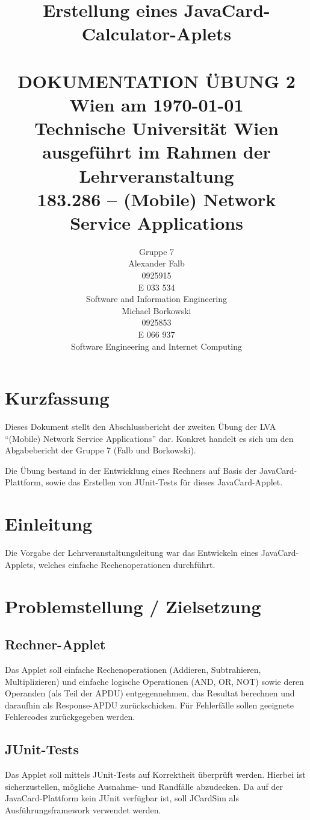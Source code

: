 \documentclass[paper=a4, fontsize=11pt]{scrartcl}
\title{	\normalsize Erstellung eines JavaCard-Calculator-Aplets%
	\\[2.0cm] \HRule{0.5pt} \\
	\LARGE \textbf{\uppercase{Dokumentation Übung 2}} %
	\HRule{2pt} \\[1.5cm]
	\normalsize Wien am \today \\
	\normalsize Technische Universität Wien \\[1.0cm]
	\normalsize ausgeführt im Rahmen der Lehrveranstaltung \\
	\LARGE 183.286 – (Mobile) Network Service Applications
}
\author{
	Gruppe 7 \\[2.0cm]
	Alexander Falb \\
	0925915 \\
	E 033 534 \\
	Software and Information Engineering \\[2.0cm]
	Michael Borkowski \\
	0925853 \\
	E 066 937 \\
	Software Engineering and Internet Computing \\[2.0cm]
}
\makeatletter
\def\printtitle{%
	{\centering \@title\par}}
\def\printauthor{%
	{\centering \normalsize \@author}}
\makeatother
\begin{document}
\thispagestyle{empty} %
\printtitle
	\vfill
\printauthor

\newpage
\tableofcontents

\newpage
\section{Kurzfassung}
Dieses Dokument stellt den Abschlussbericht der zweiten Übung der LVA \enquote{(Mobile) Network Service Applications} dar. Konkret handelt es sich um den Abgabebericht der Gruppe 7 (Falb und Borkowski).

Die Übung bestand in der Entwicklung eines Rechners auf Basis der JavaCard-Plattform, sowie das Erstellen von JUnit-Tests für dieses JavaCard-Applet.


\section{Einleitung}
Die Vorgabe der Lehrveranstaltungsleitung war das Entwickeln eines JavaCard-Applets, welches einfache Rechenoperationen durchführt.

\section{Problemstellung / Zielsetzung}
\subsection{Rechner-Applet}
Das Applet soll einfache Rechenoperationen (Addieren, Subtrahieren, Multiplizieren) und einfache logische Operationen (AND, OR, NOT) sowie deren Operanden (als Teil der APDU) entgegennehmen, das Resultat berechnen und daraufhin als Response-APDU zurückschicken. Für Fehlerfälle sollen geeignete Fehlercodes zurückgegeben werden.

\subsection{JUnit-Tests}
Das Applet soll mittels JUnit-Tests auf Korrektheit überprüft werden. Hierbei ist sicherzustellen, mögliche Ausnahme- und Randfälle abzudecken. Da auf der JavaCard-Plattform kein JUnit verfügbar ist, soll JCardSim als Ausführungsframework verwendet werden.
\end{document}
